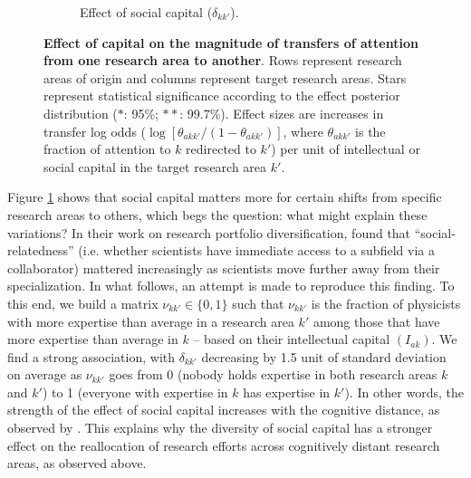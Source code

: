 \documentclass{article}
\begin{document}
\begin{figure}[h]
\begin{subfigure}{.5\textwidth}
    \caption{Effect of social capital ($\delta_{kk'}$).}
    \label{fig:social-capital-effect}
\end{subfigure}
\caption{\textbf{Effect of capital on the magnitude of transfers of attention from one research area to another}. Rows represent research areas of origin and columns represent target research areas. Stars represent statistical significance according to the effect posterior distribution ($\ast$: 95\%; $\ast\ast$: 99.7\%). Effect sizes are increases in transfer log odds ($\log {[\theta_{akk'}/(1-\theta_{akk'})]}$, where $\theta_{akk'}$ is the fraction of attention to $k$ redirected to $k'$) per unit of intellectual or social capital in the target research area $k'$.}
\label{fig:test}
\end{figure}

Figure \ref{fig:social-capital-effect} shows that social capital matters more for certain shifts from specific research areas to others, which begs the question: what might explain these variations? In their work on research portfolio diversification, \citet{Tripodi2020} found that ``social-relatedness'' (i.e. whether scientists have immediate access to a subfield via a collaborator) mattered increasingly as scientists move further away from their specialization. In what follows, an attempt is made to reproduce this finding. To this end, we build a matrix $\nu_{kk'}\in\{0,1\}$ such that $\nu_{kk'}$ is the fraction of physicists with more expertise than average in a research area $k'$ among those that have more expertise than average in $k$ -- based on their intellectual capital $(I_{ak})$. We find a strong association, with $\delta_{kk'}$ decreasing by 1.5 unit of standard deviation on average as $\nu_{kk'}$ goes from 0 (nobody holds expertise in both research areas $k$ and $k'$) to 1 (everyone with expertise in $k$ has expertise in $k'$). In other words, the strength of the effect of social capital increases with the cognitive distance, as observed by \citet{Tripodi2020}. This explains why the diversity of social capital has a stronger effect on the reallocation of research efforts across cognitively distant research areas, as observed above.

\end{document}
